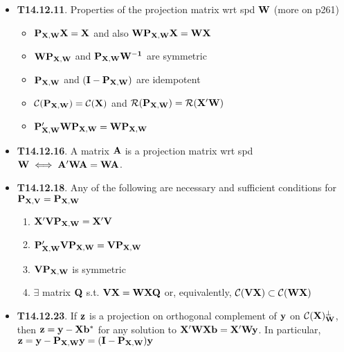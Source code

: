 \documentclass[a4paper, oneside]{book}
\begin{document}
\begin{itemize}
\begin{itemize}
	\item \textbf{T14.12.11}. Properties of the projection matrix wrt spd $\mathbf{W}$ (more on p261)
		\begin{itemize}
		\item $\mathbf{P_{X,W}X=X}$ and also $\mathbf{WP_{X,W}X=WX}$
		\item $\mathbf{WP_{X,W}}$ and $\mathbf{P_{X,W}W^{-1}}$ are symmetric
		\item $\mathbf{P_{X,W}}$ and $(\mathbf{I}-\mathbf{P_{X,W}})$ are idempotent
		\item $\mathcal{C}(\mathbf{P_{X,W}})=\mathcal{C}(\mathbf{X})$ and $\mathcal{R}(\mathbf{P_{X,W}})=\mathcal{R}(\mathbf{X'W})$
		\item $\mathbf{P'_{X,W}WP_{X,W}}=\mathbf{WP_{X,W}}$
		\end{itemize}
	\item \textbf{T14.12.16}. A matrix $\mathbf{A}$ is a projection matrix wrt spd $\mathbf{W} \iff \mathbf{A'WA=WA}$. 
	\item \textbf{T14.12.18}. Any of the following are necessary and sufficient conditions for $\mathbf{P_{X,V}}=\mathbf{P_{X,W}}$
		\begin{enumerate}
		\item $\mathbf{X'VP_{X,W}}=\mathbf{X'V}$ 
		\item $\mathbf{P'_{X,W}VP_{X,W}} = \mathbf{VP_{X,W}}$
		\item $\mathbf{VP_{X,W}}$ is symmetric
		\item $\exists$ matrix $\mathbf{Q}$ s.t. $\mathbf{VX=WXQ}$ or, equivalently, $\mathcal{C}(\mathbf{VX})\subset\mathcal{C}(\mathbf{WX})$
		\end{enumerate}
	\item \textbf{T14.12.23}. If $\mathbf{z}$ is a projection on orthogonal complement of $\mathbf{y}$ on $\mathcal{C}(\mathbf{X})^\perp_{\mathbf{W}}$, then $\mathbf{z}=\mathbf{y-Xb^*}$ for any solution to $\mathbf{X'WXb=X'Wy}$. In particular, $\mathbf{z=y-\mathbf{P}_{X,W}y}=(\mathbf{I-P_{X,W}})\mathbf{y}$
	\end{itemize}

\end{itemize}











\end{document}
